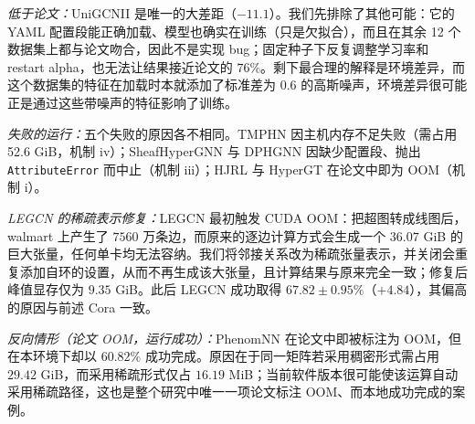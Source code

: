 \documentclass[11pt,a4paper]{article}
\begin{document}
\noindent\textit{低于论文：}UniGCNII 是唯一的大差距（$-11.1$）。我们先排除了其他可能：它的 YAML 配置段能正确加载、模型也确实在训练（只是欠拟合），而且在其余 12 个数据集上都与论文吻合，因此不是实现 bug；固定种子下反复调整学习率和 restart alpha，也无法让结果接近论文的 $76\%$。剩下最合理的解释是环境差异，而这个数据集的特征在加载时本就添加了标准差为 $0.6$ 的高斯噪声，环境差异很可能正是通过这些带噪声的特征影响了训练。

\noindent\textit{失败的运行：}五个失败的原因各不相同。TMPHN 因主机内存不足失败（需占用 52.6 GiB，机制 iv）；SheafHyperGNN 与 DPHGNN 因缺少配置段、抛出 \texttt{AttributeError} 而中止（机制 iii）；HJRL 与 HyperGT 在论文中即为 OOM（机制 i）。

\noindent\textit{LEGCN 的稀疏表示修复：}LEGCN 最初触发 CUDA OOM：把超图转成线图后，walmart 上产生了 $7560$ 万条边，而原来的逐边计算方式会生成一个 $36.07$ GiB 的巨大张量，任何单卡均无法容纳。我们将邻接关系改为稀疏张量表示，并关闭会重复添加自环的设置，从而不再生成该大张量，且计算结果与原来完全一致；修复后峰值显存仅为 $9.35$ GiB。此后 LEGCN 成功取得 $67.82\pm0.95\%$（$+4.84$），其偏高的原因与前述 Cora 一致。

\noindent\textit{反向情形（论文 OOM，运行成功）：}PhenomNN 在论文中即被标注为 OOM，但在本环境下却以 $60.82\%$ 成功完成。原因在于同一矩阵若采用稠密形式需占用 $29.42$ GiB，而采用稀疏形式仅占 $16.19$ MiB；当前软件版本很可能使该运算自动采用稀疏路径，这也是整个研究中唯一一项论文标注 OOM、而本地成功完成的案例。
\end{document}
